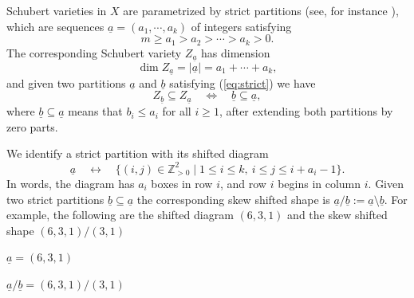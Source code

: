 \documentclass[12pt]{amsart}
\renewcommand{\a}{\underline{a}}
\renewcommand{\b}{\underline{b}}
\newcommand{\defi}[1]{{\upshape\sffamily #1}}
\theoremstyle{definition}
\numberwithin{equation}{section}
\begin{document}
Schubert varieties in $X$ are parametrized by \defi{strict partitions} (see, for instance \cite{EHP}), which are sequences
$\a=(a_1,\cdots,a_k)$ of integers satisfying
\begin{equation}\label{eq:strict}
m\geq a_1>a_2>\cdots>a_k>0.
\end{equation}
The corresponding Schubert variety $Z_{\a}$ has dimension
\[
\dim Z_{\a}=|\a|=a_1+\cdots +a_k,
\]
and given two partitions $\a$ and $\b$ satisfying (\ref{eq:strict}) we have
\[
Z_{\b}\subseteq Z_{\a}\quad \iff \quad \b\subseteq \a,
\]
where $\b\subseteq\a$ means that $b_i\leq a_i$ for all $i\geq1$,
after extending both partitions by zero parts.

We identify a strict partition with its \defi{shifted diagram}
\[
 \a\quad\longleftrightarrow\quad
 \{(i,j)\in\mathbb Z_{>0}^2\mid
       1\leq i\leq k,\ i\leq j\leq i+a_i-1\}.
\]
In words, the diagram has $a_i$ boxes in row $i$, and row $i$ begins
in column $i$. Given two strict partitions $\b\subseteq \a$ the corresponding \defi{skew shifted shape} is $\a/\b:=\a\setminus\b$. For example, the following are the shifted diagram $(6,3,1)$ and the
skew shifted shape $(6,3,1)/(3,1)$\\ 
\begin{center}
\begin{minipage}{.35\textwidth}
\centering
{}
\par\smallskip $\a=(6,3,1)$
\end{minipage}
\qquad
\begin{minipage}{.35\textwidth}
\centering
{}
\par\smallskip $\a/\b=(6,3,1)/(3,1)$
\end{minipage}
\end{center}
\end{document}
